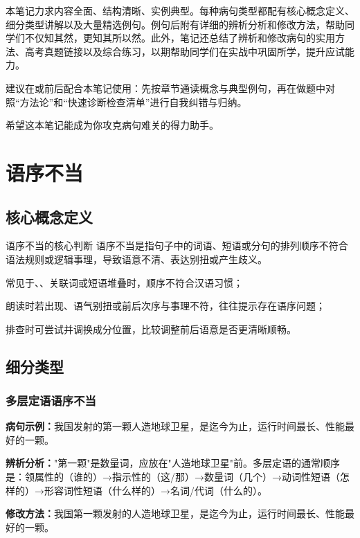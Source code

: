 \documentclass[a4paper,12pt]{ctexrep}
\newcommand{\exampleicon}{\textcolor{highlight}{\faExclamationTriangle}}
\newcommand{\analysisicon}{\textcolor{accent}{\faSearch}}
\newcommand{\revisionicon}{\textcolor{secondary}{\faCheckCircle}}
\begin{document}
本笔记力求内容全面、结构清晰、实例典型。每种病句类型都配有核心概念定义、细分类型讲解以及大量精选例句。例句后附有详细的辨析分析和修改方法，帮助同学们不仅知其然，更知其所以然。此外，笔记还总结了辨析和修改病句的实用方法、高考真题链接以及综合练习，以期帮助同学们在实战中巩固所学，提升应试能力。

建议在或前后配合本笔记使用：先按章节通读概念与典型例句，再在做题中对照“方法论”和“快速诊断检查清单”进行自我纠错与归纳。

希望这本笔记能成为你攻克病句难关的得力助手。

\chapter{语序不当}
\section{核心概念定义}
\begin{conceptbox}{语序不当的核心判断}
语序不当是指句子中的词语、短语或分句的排列顺序不符合语法规则或逻辑事理，导致语意不清、表达别扭或产生歧义。
\begin{focuspoints}
  \item 常见于、、关联词或短语堆叠时，顺序不符合汉语习惯；
  \item 朗读时若出现、语气别扭或前后次序与事理不符，往往提示存在语序问题；
  \item 排查时可尝试并调换成分位置，比较调整前后语意是否更清晰顺畅。
\end{focuspoints}
\end{conceptbox}

\section{细分类型}
\subsection{多层定语语序不当}
\exampleicon \textbf{病句示例：}我国发射的第一颗人造地球卫星，是迄今为止，运行时间最长、性能最好的一颗。

\analysisicon \textbf{辨析分析：}"第一颗"是数量词，应放在"人造地球卫星"前。多层定语的通常顺序是：领属性的（谁的）→指示性的（这/那）→数量词（几个）→动词性短语（怎样的）→形容词性短语（什么样的）→名词/代词（什么的）。

\revisionicon \textbf{修改方法：}我国第一颗发射的人造地球卫星，是迄今为止，运行时间最长、性能最好的一颗。
\end{document}
